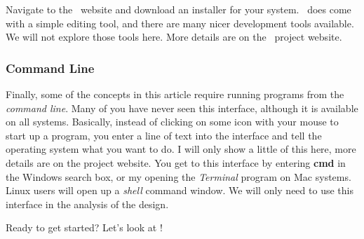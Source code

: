 Navigate to the \PY\ website \cite{python} and download an installer for your
system. \PY\ does come with a simple editing tool, and there are many nicer
development tools available. We will not explore those tools here. More details
are on the \MM\ project website.

\subsubsection{Command Line}

Finally, some of the concepts in this article require running programs from the
{\it command line}. Many of you have never seen this interface, although it is
available on all systems. Basically, instead of clicking on some icon with your
mouse to start up a program, you enter a line of text into the interface and
tell the operating system what you want to do. I will only show a little of this
here, more details are on the project website. You get to this interface by
entering {\bf cmd} in the Windows search box, or my opening the {\it Terminal}
program on  Mac systems. Linux users will open up a {\it shell} command window.
We will only need to use this interface in the analysis of the design.


Ready to get started? Let's look at \osc!


